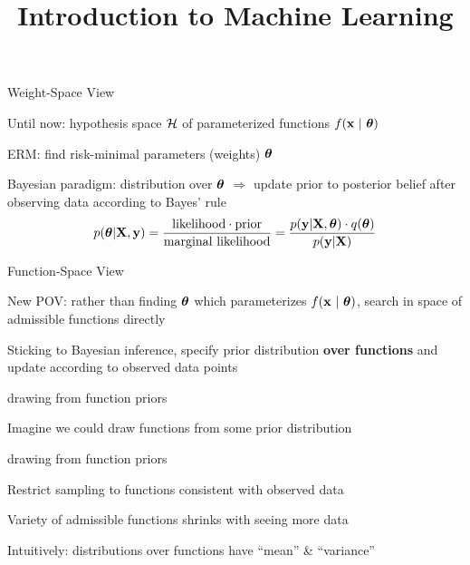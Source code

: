 \documentclass[11pt,compress,t,notes=noshow, xcolor=table]{beamer}
\title{Introduction to Machine Learning}
\begin{document}

\begin{framei}[sep=L]{Weight-Space View}
\item Until now: hypothesis space $\mathcal{H}$ of parameterized functions $f(\mathbf{x} ~|~ \bm{\theta})$ %
\item ERM: find risk-minimal parameters (weights) $\bm{\theta}$
\item Bayesian paradigm: distribution over $\bm{\theta}$ $\Rightarrow$ update prior to posterior belief after observing data according to Bayes' rule
$$
p(\bm{\theta} | \mathbf{X}, \mathbf{y}) 
= \frac{\text{likelihood} \cdot \text{prior}}{\text{marginal likelihood}} 
= \frac{p(\mathbf{y} | \mathbf{X}, \bm{\theta}) \cdot q(\bm{\theta})}{p(\mathbf{y}|\mathbf{X})}
$$
\end{framei}

\begin{framei}[sep=L]{Function-Space View}
\item New POV: rather than finding $\bm{\theta}$ which parameterizes $f(\mathbf{x} ~|~ \bm{\theta})$,  search in space of admissible functions directly
\item Sticking to Bayesian inference, specify prior distribution \textbf{over functions} and update according to observed data points
\end{framei}

\begin{framei}{drawing from function priors}
\item Imagine we could draw functions from some prior distribution

\vfill

\end{framei}

\begin{framei}{drawing from function priors}
\item Restrict sampling to functions consistent with observed data
\vfill
{}
\vfill
{}
\item Variety of admissible functions shrinks with seeing more data
\item Intuitively: distributions over functions have ``mean'' \& ``variance''
\end{framei}
\end{document}

